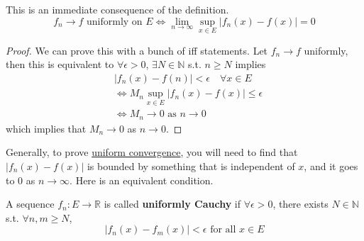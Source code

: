   \begin{theorem}
    \label{thm:uniform-convergence-iff-supremum-of-difference}
    This is an immediate consequence of the definition. 
    \begin{equation}
      f_n \to f \text{ uniformly on } E \iff \lim_{n \to \infty} \sup_{x \in E} |f_n (x) - f(x)| = 0
    \end{equation}
  \end{theorem}
  \begin{proof}
    We can prove this with a bunch of iff statements. Let $f_n \to f$ uniformly, then this is equivalent to $\forall \epsilon > 0$, $\exists N \in \mathbb{N}$ s.t. $n \geq N$ implies
    \begin{align}
      & |f_n (x) - f(n)| < \epsilon \quad \forall x \in E \\ 
      & \iff M_n \sup_{x \in E} |f_n (x) - f(x)| \leq \epsilon \\ 
      & \iff M_n \to 0 \text{ as } n \to 0
    \end{align}
    which implies that $M_n \to 0$ as $n \to 0$. 
  \end{proof}

  Generally, to prove \hyperref[def:uniform-convergence]{uniform convergence}, you will need to find that $|f_n (x) - f(x)|$ is bounded by something that is independent of $x$, and it goes to $0$ as $n \to \infty$. Here is an equivalent condition. 

  \begin{definition}
    \label{def:uniformly-cauchy}
    A sequence $f_n: E \to \mathbb{R}$ is called \textbf{uniformly Cauchy} if $\forall \epsilon > 0$, there exists $N \in \mathbb{N}$ s.t. $\forall n, m \geq N$, 
    \begin{equation}
      |f_n (x) - f_m (x)| < \epsilon \text{ for all } x \in E
    \end{equation}
  \end{definition}

